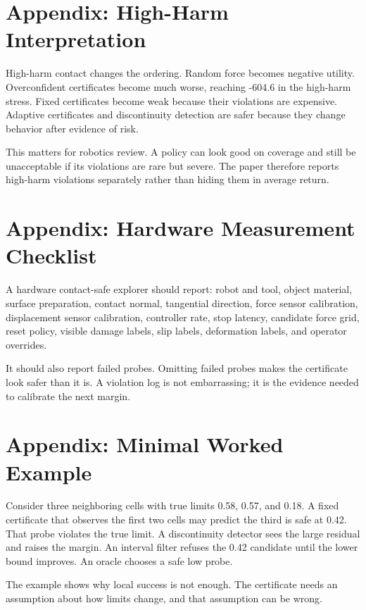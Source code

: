 \documentclass{article}
\begin{document}
\section{Appendix: High-Harm Interpretation}

High-harm contact changes the ordering. Random force becomes negative utility.
Overconfident certificates become much worse, reaching -604.6 in the high-harm
stress. Fixed certificates become weak because their violations are expensive.
Adaptive certificates and discontinuity detection are safer because they change
behavior after evidence of risk.

This matters for robotics review. A policy can look good on coverage and still
be unacceptable if its violations are rare but severe. The paper therefore
reports high-harm violations separately rather than hiding them in average
return.

\section{Appendix: Hardware Measurement Checklist}

A hardware contact-safe explorer should report: robot and tool, object
material, surface preparation, contact normal, tangential direction, force
sensor calibration, displacement sensor calibration, controller rate, stop
latency, candidate force grid, reset policy, visible damage labels, slip
labels, deformation labels, and operator overrides.

It should also report failed probes. Omitting failed probes makes the
certificate look safer than it is. A violation log is not embarrassing; it is
the evidence needed to calibrate the next margin.

\section{Appendix: Minimal Worked Example}

Consider three neighboring cells with true limits 0.58, 0.57, and 0.18. A
fixed certificate that observes the first two cells may predict the third is
safe at 0.42. That probe violates the true limit. A discontinuity detector sees
the large residual and raises the margin. An interval filter refuses the 0.42
candidate until the lower bound improves. An oracle chooses a safe low probe.

The example shows why local success is not enough. The certificate needs an
assumption about how limits change, and that assumption can be wrong.
\end{document}
